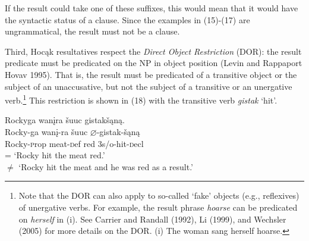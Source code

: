 \documentclass[output=paper]{LSP/langsci}
\begin{document}
\begin{exe}
\ex
\begin{xlist}



\end{xlist}
\end{exe}

If the result could take one of these suffixes, this would mean that it would have the syntactic status of a clause. Since the examples in (15)-(17) are ungrammatical, the result must not be a clause.

Third, Hoc\k{a}k resultatives respect the \textit{Direct Object Restriction} (DOR): the result predicate must be predicated on the NP in object position (Levin and Rappaport Hovav 1995). That is, the result must be predicated of a transitive object or the subject of an unaccusative, but not the subject of a transitive or an unergative verb.\footnote{Note that the DOR can also apply to so-called `fake' objects (e.g., reflexives) of unergative verbs. For example, the result phrase \textit{hoarse} can be predicated on \textit{herself} in (i). See Carrier and Randall (1992), Li (1999), and Wechsler (2005) for more details on the DOR. (i) The woman sang herself hoarse.} This restriction is shown in (18) with the transitive verb \textit{gistak} `hit'.

\begin{exe}

\ex \glll Rockyga wan\k{i}ra \v{s}uuc gistak\v{s}\k{a}n\k{a}.\\ 
Rocky-ga wan\k{i}-ra \v{s}uuc $\varnothing$-gistak-\v{s}\k{a}n\k{a}\\
Rocky-{\textsc prop} meat-{\textsc def} red {\textsc 3s/o}-hit-{\textsc decl}\\
\glt = `Rocky hit the meat red.' \vspace{-3pt} \\ 
$\not=$ `Rocky hit the meat  and he was red as a result.'

\end{exe}
\end{document}
